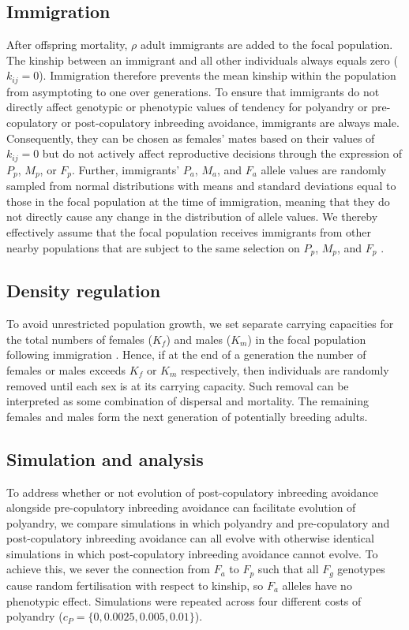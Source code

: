 \documentclass[12pt]{article}
\begin{document}
\subsection*{Immigration}

After offspring mortality, $\rho$ adult immigrants are added to the focal population. The kinship between an immigrant and all other individuals always equals zero ($k_{ij}=0$). Immigration therefore prevents the mean kinship within the population from asymptoting to one over generations. To ensure that immigrants do not directly affect genotypic or phenotypic values of tendency for polyandry or pre-copulatory or post-copulatory inbreeding avoidance, immigrants are always male. Consequently, they can be chosen as females' mates based on their values of $k_{ij}=0$ but do not actively affect reproductive decisions through the expression of $P_{p}$, $M_{p}$, or $F_{p}$. Further, immigrants' $P_{a}$, $M_{a}$, and $F_{a}$ allele values are randomly sampled from normal distributions with means and standard deviations equal to those in the focal population at the time of immigration, meaning that they do not directly cause any change in the distribution of allele values. We thereby effectively assume that the focal population receives immigrants from other nearby populations that are subject to the same selection on $P_{p}$, $M_{p}$, and $F_{p}$ \cite[][]{Duthie, Duthie2016a}.

\subsection*{Density regulation}

To avoid unrestricted population growth, we set separate carrying capacities for the total numbers of females ($K_{f}$) and males ($K_{m}$) in the focal population following immigration \cite[][]{Guillaume2009, Duthie}. Hence, if at the end of a generation the number of females or males exceeds $K_{f}$ or $K_{m}$  respectively, then individuals are randomly removed until each sex is at its carrying capacity. Such removal can be interpreted as some combination of dispersal and mortality. The remaining females and males form the next generation of potentially breeding adults.

\subsection*{Simulation and analysis}

To address whether or not evolution of post-copulatory inbreeding avoidance alongside pre-copulatory inbreeding avoidance can facilitate evolution of polyandry, we compare simulations in which polyandry and pre-copulatory and post-copulatory inbreeding avoidance can all evolve with otherwise identical simulations in which post-copulatory inbreeding avoidance cannot evolve. To achieve this, we sever the connection from $F_{a}$ to $F_{p}$ such that all $F_{g}$ genotypes cause random fertilisation with respect to kinship, so $F_{a}$ alleles have no phenotypic effect. Simulations were repeated across four different costs of polyandry ($c_{P} = \{0, 0.0025, 0.005,  0.01\}$).
\end{document}
